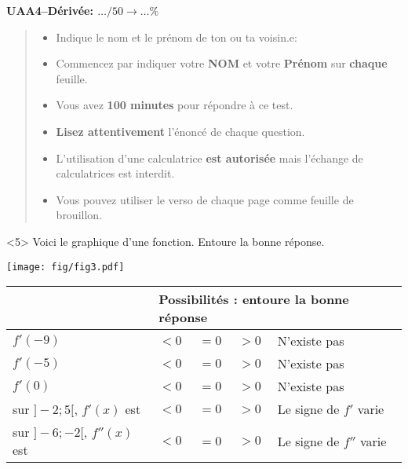 \documentclass[a4paper,12pt, rulers]{tests2}
\begin{document}
\begin{center}


\Large \textbf{ UAA4--Dérivée: \(\ldots/50\rightarrow \ldots\%\)}
\end{center}

\begin{abstract}
\begin{itemize}
\item Indique le nom et le prénom de ton ou ta voisin.e:\dotfill
\item Commencez par indiquer votre \textbf{NOM} et votre \textbf{Prénom} sur \textbf{chaque} feuille.
\item Vous avez \textbf{100 minutes} pour répondre à ce test.
\item \textbf{Lisez attentivement} l'énoncé de chaque question.
\item L'utilisation d'une calculatrice \textbf{est autorisée} mais l'échange de
calculatrices est interdit.
\item Vous pouvez utiliser le verso de chaque page comme
feuille de brouillon.
\end{itemize}
\end{abstract}
\newpage
\begin{question}<5>
Voici le graphique d'une fonction. Entoure la bonne réponse.

\begin{center}
  \texttt{[image: fig/fig3.pdf]}
\end{center}
\begin{center}
  \begin{tabular}{|l|llll|}
    \hline
    & \multicolumn{4}{l|}{Possibilités : entoure la bonne réponse}                                        \\ \hline
    $f'(-9)$                    & \multicolumn{1}{l|}{$<0$} & \multicolumn{1}{l|}{$=0$} & \multicolumn{1}{l|}{$>0$} & N’existe pas            \\ \hline
    $f'(-5)$                    & \multicolumn{1}{l|}{$<0$} & \multicolumn{1}{l|}{$=0$} & \multicolumn{1}{l|}{$>0$} & N’existe pas            \\ \hline
    $f'(0)$                     & \multicolumn{1}{l|}{$<0$} & \multicolumn{1}{l|}{$=0$} & \multicolumn{1}{l|}{$>0$} & N’existe pas            \\ \hline
    sur $]-2;5[$, $f'(x)$ est    & \multicolumn{1}{l|}{$<0$} & \multicolumn{1}{l|}{$=0$} & \multicolumn{1}{l|}{$>0$} & Le signe de $f'$ varie  \\ \hline
    sur $]-6;-2[$, $f''(x)$ est & \multicolumn{1}{l|}{$<0$} & \multicolumn{1}{l|}{$=0$} & \multicolumn{1}{l|}{$>0$} & Le signe de $f''$ varie \\ \hline
  \end{tabular}
\end{center}

\end{question}
\end{document}
